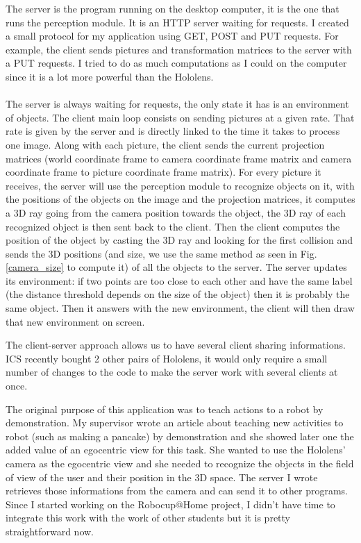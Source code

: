 \documentclass[a4paper, twocolumn]{article}
\begin{document}
    The server is the program running on the desktop computer, it is the one that runs the perception module. It is an HTTP server waiting for requests. I created a small protocol for my application using GET, POST and PUT requests. For example, the client sends pictures and transformation matrices to the server with a PUT requests. I tried to do as much computations as I could on the computer since it is a lot more powerful than the Hololens.
    
    \paragraph{}
    The server is always waiting for requests, the only state it has is an environment of objects.
    The client main loop consists on sending pictures at a given rate. That rate is given by the server and is directly linked to the time it takes to process one image. Along with each picture, the client sends the current projection matrices (world coordinate frame to camera coordinate frame matrix and camera coordinate frame to picture coordinate frame matrix). For every picture it receives, the server will use the perception module to recognize objects on it, with the positions of the objects on the image and the projection matrices, it computes a 3D ray going from the camera position towards the object, the 3D ray of each recognized object is then sent back to the client. Then the client computes the position of the object by casting the 3D ray and looking for the first collision and sends the 3D positions (and size, we use the same method as seen in Fig. \ref{camera_size} to compute it) of all the objects to the server. The server updates its environment: if two points are too close to each other and have the same label (the distance threshold depends on the size of the object) then it is probably the same object. Then it answers with the new environment, the client will then draw that new environment on screen.
    
    The client-server approach allows us to have several client sharing informations. ICS recently bought 2 other pairs of Hololens, it would only require a small number of changes to the code to make the server work with several clients at once.
    
    The original purpose of this application was to teach actions to a robot by demonstration. My supervisor wrote an article \cite{artint2881} about teaching new activities to robot (such as making a pancake) by demonstration and she showed later one the added value \cite{addedvalue} of an egocentric view for this task. She wanted to use the Hololens' camera as the egocentric view and she needed to recognize the objects in the field of view of the user and their position in the 3D space. The server I wrote retrieves those informations from the camera and can send it to other programs. Since I started working on the Robocup@Home project, I didn't have time to integrate this work with the work of other students but it is pretty straightforward now.
    
\end{document}
